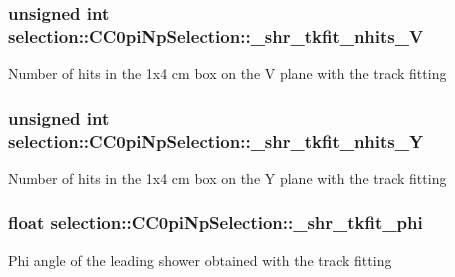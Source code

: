 \subsubsection[{\texorpdfstring{\+\_\+shr\+\_\+tkfit\+\_\+nhits\+\_\+V}{_shr_tkfit_nhits_V}}]{\setlength{\rightskip}{0pt plus 5cm}unsigned int selection\+::\+C\+C0pi\+Np\+Selection\+::\+\_\+shr\+\_\+tkfit\+\_\+nhits\+\_\+V\hspace{0.3cm}{\ttfamily [private]}}\hypertarget{classselection_1_1CC0piNpSelection_adab23c54dd799cdf83c31a10e4ae9061}{}\label{classselection_1_1CC0piNpSelection_adab23c54dd799cdf83c31a10e4ae9061}
Number of hits in the 1x4 cm box on the V plane with the track fitting 
\subsubsection[{\texorpdfstring{\+\_\+shr\+\_\+tkfit\+\_\+nhits\+\_\+Y}{_shr_tkfit_nhits_Y}}]{\setlength{\rightskip}{0pt plus 5cm}unsigned int selection\+::\+C\+C0pi\+Np\+Selection\+::\+\_\+shr\+\_\+tkfit\+\_\+nhits\+\_\+Y\hspace{0.3cm}{\ttfamily [private]}}\hypertarget{classselection_1_1CC0piNpSelection_ae3a53326b19594013c9df08b66ccaa73}{}\label{classselection_1_1CC0piNpSelection_ae3a53326b19594013c9df08b66ccaa73}
Number of hits in the 1x4 cm box on the Y plane with the track fitting 
\subsubsection[{\texorpdfstring{\+\_\+shr\+\_\+tkfit\+\_\+phi}{_shr_tkfit_phi}}]{\setlength{\rightskip}{0pt plus 5cm}float selection\+::\+C\+C0pi\+Np\+Selection\+::\+\_\+shr\+\_\+tkfit\+\_\+phi\hspace{0.3cm}{\ttfamily [private]}}\hypertarget{classselection_1_1CC0piNpSelection_aefb0bc61c417330a448ababb5363ad8f}{}\label{classselection_1_1CC0piNpSelection_aefb0bc61c417330a448ababb5363ad8f}
Phi angle of the leading shower obtained with the track fitting 
